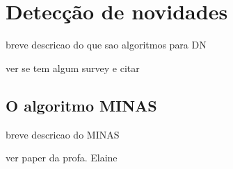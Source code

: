 




\section{Detecção de novidades}

breve descricao do que sao algoritmos para DN

ver se tem algum survey e citar

\subsection{O algoritmo MINAS}

breve descricao do MINAS

ver paper da profa. Elaine

